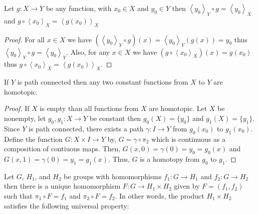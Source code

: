 \documentclass[12pt]{extarticle}
\newcommand{\const}[2]{\left< #1 \right>_{#2}}
\begin{document}
\begin{lemma} \label{constmaps}
Let $g : X \to Y$ be any function, with $x_0 \in X$ and $y_0 \in Y$ then $\const{y_0}{Y} \circ g = \const{y_0}{X}$ and $g \circ \const{x_0}{X} = \const{g(x_0)}{X}$
\end{lemma}

\begin{proof}
For all $x \in X$ we have $(\const{y_0}{Y} \circ g)(x) = \const{y_0}{Y}(g(x)) = y_0$ thus $ \const{y_0}{Y} \circ g = \const{y_0}{Y}$. Also, for any $x \in X$ we have $(g \circ \const{x_0}{X})(x) = g(x_0)$ thus $g \circ \const{x_0}{X} = \const{g(x_0)}{X}$.
\end{proof}


\begin{lemma} \label{pathconnectedhomotopicconsts}
If $Y$ is path connected then any two constant functions from $X$ to $Y$ are homotopic. 
\end{lemma}

\begin{proof}
If $X$ is empty than all functions from $X$ are homotopic. Let $X$ be nonempty, let $g_0, g_1 : X \to Y$ be constant then $g_0(X) = \{y_0\}$ and $g_1(X) = \{y_1\}$. Since $Y$ is path connected, there exists a path $\gamma : I \to Y$ from $g_0(x_0)$ to $g_1(x_0)$. Define the function $G : X \times I \to Y$ by, $G = \gamma \circ \pi_2$ which is continuous as a composition of contiuous maps. Then, $G(x,0) = \gamma(0) = y_0 = g_0(x)$ and $G(x, 1) = \gamma(0) = y_1 = g_1(x)$. Thus, $G$ is a homotopy from $g_0$ to $g_1$. 
\end{proof}

\begin{lemma} \label{comphomos}
Let $G$, $H_1$, and $H_2$ be groups with homomorphisms $f_1 : G \to H_1$ and $f_2 : G \to H_2$ then there is a unique homomorphism $F : G \to H_1 \times H_2$ given by $F = (f_1, f_2)$ such that $\pi_1 \circ F = f_1$ and $\pi_2 \circ F = f_2$. In other words, the product $H_1 \times H_2$ satisfies the following universal property:  

\begin{center}
\end{center}
  
\end{lemma}
\end{document}
